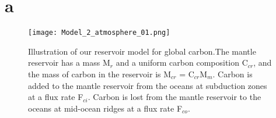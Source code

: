 \documentclass[11pt]{article}
\begin{document}
\section{a}

\begin{figure}
  \centering
  \texttt{[image: Model\_2\_atmosphere\_01.png]}
  \caption{\doublespacing Illustration of our reservoir model for global carbon.The mantle reservoir has a mass M\(_r\) and a uniform carbon composition C\(_{cr}\), and the mass of carbon in the reservoir is M\(_{cr}\) = C\(_{cr}\)M\(_m\). Carbon is added to the mantle reservoir from the oceans at subduction zones at a flux rate F\(_{ci}\). Carbon is lost from the mantle reservoir to the oceans at mid-ocean ridges at a flux rate F\(_{co}\).}
  \label{fig:9}
\end{figure}
\end{document}
